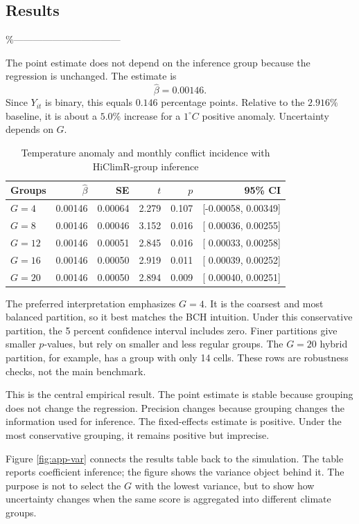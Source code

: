 \documentclass[
]{article}
\begin{document}
\subsection{Results}

\%---------------------------------

The point estimate does not depend on the inference group because the
regression is unchanged. The estimate is \[
\widehat\beta=0.00146.
\] Since \(Y_{it}\) is binary, this equals \(0.146\) percentage points.
Relative to the \(2.916\%\) baseline, it is about a \(5.0\%\) increase
for a \(1^\circ C\) positive anomaly. Uncertainty depends on \(G\).

\begin{table}[H]
\centering
\caption{Temperature anomaly and monthly conflict incidence with HiClimR-group inference}
\label{tab:bch-results}
\begin{tabular}{lrrrrr}
\toprule
Groups & \(\widehat\beta\) & SE & \(t\) & \(p\) & 95\% CI\\
\midrule
\(G=4\)  & 0.00146 & 0.00064 & 2.279 & 0.107 & [-0.00058, 0.00349]\\
\(G=8\)  & 0.00146 & 0.00046 & 3.152 & 0.016 & [ 0.00036, 0.00255]\\
\(G=12\) & 0.00146 & 0.00051 & 2.845 & 0.016 & [ 0.00033, 0.00258]\\
\(G=16\) & 0.00146 & 0.00050 & 2.919 & 0.011 & [ 0.00039, 0.00252]\\
\(G=20\) & 0.00146 & 0.00050 & 2.894 & 0.009 & [ 0.00040, 0.00251]\\
\bottomrule
\end{tabular}
\end{table}

The preferred interpretation emphasizes \(G=4\). It is the coarsest and
most balanced partition, so it best matches the BCH intuition. Under
this conservative partition, the 5 percent confidence interval includes
zero. Finer partitions give smaller \(p\)-values, but rely on smaller
and less regular groups. The \(G=20\) hybrid partition, for example, has
a group with only 14 cells. These rows are robustness checks, not the
main benchmark.

This is the central empirical result. The point estimate is stable
because grouping does not change the regression. Precision changes
because grouping changes the information used for inference. The
fixed-effects estimate is positive. Under the most conservative
grouping, it remains positive but imprecise.

Figure \ref{fig:app-var} connects the results table back to the
simulation. The table reports coefficient inference; the figure shows
the variance object behind it. The purpose is not to select the \(G\)
with the lowest variance, but to show how uncertainty changes when the
same score is aggregated into different climate groups.
\end{document}
